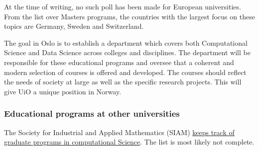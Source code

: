 \documentclass{beamer}
\begin{document}
\begin{frame}
At the time of writing, no such poll has been made for European universities. From the list over Masters programs, the countries with the largest focus on these topics are Germany, Sweden and Switzerland. 

The goal in Oslo is to establish a department which covers both Computational Science and Data Science across colleges and disciplines. The department will be responsible for these educational programs and oversee that a coherent and modern selection of courses is offered and developed. The courses should reflect the needs of society at large as well as the specific research projects.  This will give UiO a unique position in Norway.
\end{frame}

\begin{frame}
\frametitle{Educational programs at  other universities}

The Society for Industrial and Applied Mathematics (SIAM) \href{{https://www.siam.org/students/resources/cse_programs.php}}{keeps track of graduate programs in computational Science}. The list is most likely not complete.
\end{frame}
\end{document}
